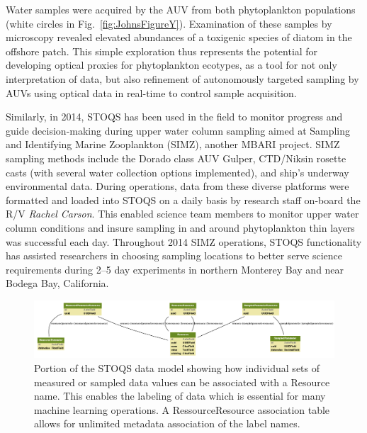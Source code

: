 \documentclass[conference]{IEEEtran}
\begin{document}
Water samples were acquired by the AUV from both phytoplankton populations (white circles in Fig.~\ref{fig:JohnsFigureY}).  Examination of these samples by microscopy revealed elevated abundances of a toxigenic species of diatom in the offshore patch.  This simple exploration thus represents the potential for developing optical proxies for phytoplankton ecotypes, as a tool for not only interpretation of data, but also refinement of autonomously targeted sampling by AUVs using optical data in real-time to control sample acquisition.


Similarly, in 2014, STOQS has been used in the field to monitor progress and guide decision-making during upper water column sampling aimed at Sampling and Identifying Marine Zooplankton (SIMZ), another MBARI project.  SIMZ sampling methods include the Dorado class AUV Gulper, CTD/Niksin rosette casts (with several water collection options implemented), and ship’s underway environmental data.  During operations, data from these diverse platforms were formatted and loaded into STOQS on a daily basis by research staff on-board the R/V \textit{Rachel Carson}.  This enabled science team members to monitor upper water column conditions and insure sampling in and around phytoplankton thin layers was successful each day. Throughout 2014 SIMZ operations, STOQS functionality has assisted researchers in choosing sampling locations to better serve science requirements during 2–5 day experiments in northern Monterey Bay and near Bodega Bay, California.

\begin{figure}[htbp]
\centering
\includegraphics[width=6.6in]{stoqs_simple_model_labels.png}
\caption{Portion of the STOQS data model showing how individual sets of measured or sampled data values can be associated with a Resource name. This enables the labeling of data which is essential for many machine learning operations. A RessourceResource association table allows for unlimited metadata association of the label names.}
\label{fig:stoqs_simple_model_labels}
\end{figure}
\end{document}
